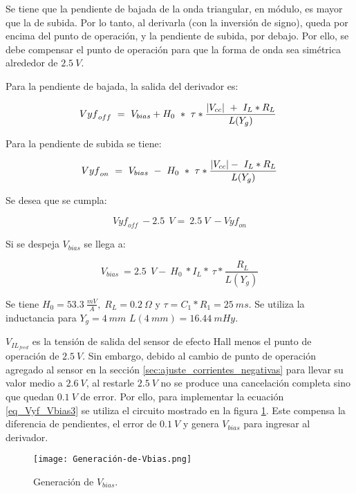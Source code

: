 Se tiene que la pendiente de bajada de la onda triangular, en módulo, es mayor que la de subida. Por lo tanto, al derivarla (con la inversión de signo), queda por encima del punto de operación, y la pendiente de subida, por debajo. Por ello, se debe compensar el punto de operación para que la forma de onda sea simétrica alrededor de $2.5\:V$. 

Para la pendiente de bajada, la salida del derivador es:

\begin{equation} \label{eq_Vyf-Vbias}
	{Vyf}_{off}\ =\ V_{bias}+H_0\ *\ \tau *\frac{\abs{V_{cc}}\ +\ I_L*R_L}{L(Y_g)}\ 
\end{equation}

Para la pendiente de subida se tiene:

\begin{equation} \label{eq_Vyf-Vbias2}
	{Vyf}_{on}\ =\ V_{bias}\ -\ H_0\ *\ \tau *\frac{\abs{V_{cc}} -\ I_L*R_L}{L(Y_g)}
\end{equation}

Se desea que se cumpla:

\begin{equation} \label{eq_Vyf_Vbias3}
	{Vyf}_{off}\ -2.5\ \:V=\ 2.5\ V\ -{Vyf}_{on}
\end{equation}

Si se despeja $V_{bias}$ se llega a:

\begin{equation} \label{eq_Vyf-Vbias4}
	V_{bias}\ =2.5\ \:V -\ H_0\ *I_L*\ \tau *\frac{\ R_L}{L(Y_g)}
\end{equation}

Se tiene $H_0 = 53.3\:\frac{mV}{A},\; R_L = 0.2\:\Omega$ y $\tau=C_1*R_1=25 \:ms$. Se utiliza la inductancia para $Y_g=4\:mm$ $L(4\:mm) = 16.44\:mHy$.

$V_{IL_{feed}}$ es la tensión de salida del sensor de efecto Hall menos el punto de operación de $2.5\:V$. Sin embargo, debido al cambio de punto de operación agregado al sensor en la sección \ref{sec:ajuste_corrientes_negativas} para llevar su valor medio a $2.6\:V$, al restarle $2.5\:V$ no se produce una cancelación completa sino que quedan $0.1\:V$ de error. Por ello, para implementar la ecuación  \ref{eq_Vyf_Vbias3} se utiliza el circuito mostrado en la figura \ref{fig:img_Generación_de_Vbias}. Este compensa la diferencia de pendientes, el error de $0.1\:V$ y genera $V_{bias}$ para ingresar al derivador.

\begin{figure}[H]
	\centering
	\texttt{[image: Generación-de-Vbias.png]}
	\caption{Generación de $V_{bias}$.}
	\label{fig:img_Generación_de_Vbias}
\end{figure}

